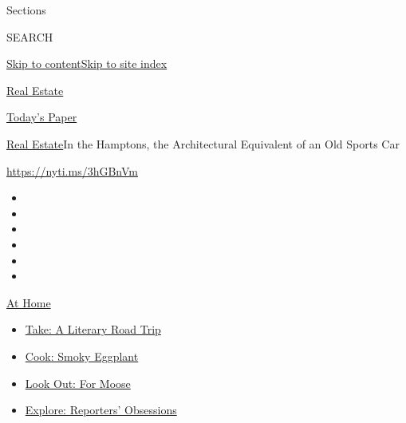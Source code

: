 Sections

SEARCH

\protect\hyperlink{site-content}{Skip to
content}\protect\hyperlink{site-index}{Skip to site index}

\href{https://www.nytimes.com/section/realestate}{Real Estate}

\href{https://myaccount.nytimes.com/auth/login?response_type=cookie\&client_id=vi}{}

\href{https://www.nytimes.com/section/todayspaper}{Today's Paper}

\href{/section/realestate}{Real Estate}\textbar{}In the Hamptons, the
Architectural Equivalent of an Old Sports Car

\url{https://nyti.ms/3hGBnVm}

\begin{itemize}
\item
\item
\item
\item
\item
\item
\end{itemize}

\href{https://www.nytimes.com/spotlight/at-home?action=click\&pgtype=Article\&state=default\&region=TOP_BANNER\&context=at_home_menu}{At
Home}

\begin{itemize}
\tightlist
\item
  \href{https://www.nytimes.com/2020/07/28/books/time-for-a-literary-road-trip.html?action=click\&pgtype=Article\&state=default\&region=TOP_BANNER\&context=at_home_menu}{Take:
  A Literary Road Trip}
\item
  \href{https://www.nytimes.com/2020/07/29/magazine/bored-with-your-home-cooking-some-smoky-eggplant-will-fix-that.html?action=click\&pgtype=Article\&state=default\&region=TOP_BANNER\&context=at_home_menu}{Cook:
  Smoky Eggplant}
\item
  \href{https://www.nytimes.com/2020/07/27/travel/moose-michigan-isle-royale.html?action=click\&pgtype=Article\&state=default\&region=TOP_BANNER\&context=at_home_menu}{Look
  Out: For Moose}
\item
  \href{https://www.nytimes.com/interactive/2020/at-home/even-more-reporters-editors-diaries-lists-recommendations.html?action=click\&pgtype=Article\&state=default\&region=TOP_BANNER\&context=at_home_menu}{Explore:
  Reporters' Obsessions}
\end{itemize}

